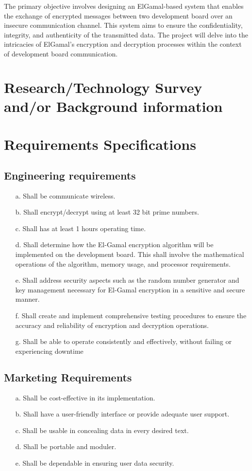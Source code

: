 \documentclass[12pt]{article}
\begin{document}
	The primary objective involves designing an ElGamal-based system that enables the exchange of encrypted messages between two development board over an insecure communication channel. This system aims to ensure the confidentiality, integrity, and authenticity of the transmitted data. The project will delve into the intricacies of ElGamal's encryption and decryption processes within the context of development board communication.
	\section{Research/Technology Survey and/or Background information}
	
	\section{Requirements Specifications}
		
	\subsection{Engineering requirements}
	\begin{enumerate}
		\item[a.] Shall be communicate wireless.
		\item[b.] Shall encrypt/decrypt using at least 32 bit prime numbers.
		\item[c.] Shall has at least 1 hours operating time.
		\item[d.] Shall determine how the El-Gamal encryption algorithm will be implemented on the development board. This shall involve the mathematical operations of the algorithm, memory usage, and processor requirements. 
		\item[e.] Shall address security aspects such as the random number generator and key management necessary for El-Gamal encryption in a sensitive and secure manner.
		\item[f.] Shall create and implement comprehensive testing procedures to ensure the accuracy and reliability of encryption and decryption operations.
		\item[g.] Shall be able to operate consistently and effectively, without failing or
		experiencing downtime
				
	\end{enumerate}
	\subsection{Marketing Requirements}
	\begin{enumerate}
		\item[a.] Shall be cost-effective in its implementation.
		\item[b.] Shall have a user-friendly interface or provide adequate user support.
		\item[c.] Shall be usable in concealing data in every desired text.
		\item[d.] Shall be portable and moduler.
		\item[e.] Shall be dependable in ensuring user data security.				
	\end{enumerate}
\end{document}
